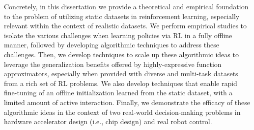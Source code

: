 \documentclass[../thesis.tex]{subfiles}
\begin{document}
Concretely, in this dissertation we provide a theoretical and empirical foundation to the problem of utilizing static datasets in reinforcement learning, especially relevant within the context of realistic datasets. We perform empirical studies to isolate the various challenges when learning policies via RL in a fully offline manner, followed by developing algorithmic techniques to address these challenges. Then, we develop techniques to scale up these algorithmic ideas to leverage the generalization benefits offered by highly-expressive function approximators, especially when provided with diverse and multi-task datasets from a rich set of RL problems. We also develop techniques that enable rapid fine-tuning of an offline initialization learned from the static dataset, with a limited amount of active interaction. Finally, we demonstrate the efficacy of these algorithmic ideas in the context of two real-world decision-making problems in hardware accelerator design (i.e., chip design) and real robot control.  



\end{document}
